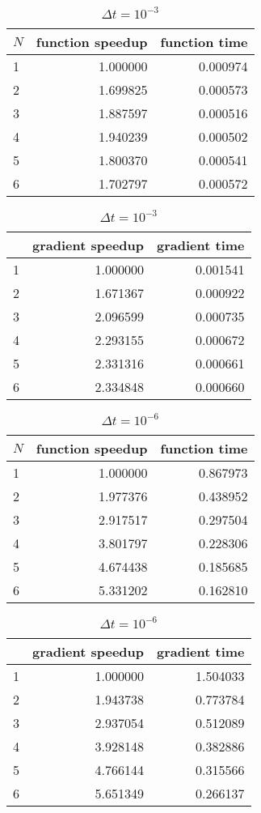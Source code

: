 \begin{table}[!h]
\centering
\caption{$\Delta t=10^{-3}$}
\begin{tabular}{lrr}
\toprule
{}$N$ &  function speedup &     function time \\
\midrule
1 &  1.000000 &  0.000974 \\
2 &  1.699825 &  0.000573 \\
3 &  1.887597 &  0.000516 \\
4 &  1.940239 &  0.000502 \\
5 &  1.800370 &  0.000541 \\
6 &  1.702797 &  0.000572 \\
\bottomrule
\end{tabular}
\begin{tabular}{lrr}
\toprule
{} &  gradient speedup &    gradient time \\
\midrule
1 &  1.000000 &  0.001541 \\
2 &  1.671367 &  0.000922 \\
3 &  2.096599 &  0.000735 \\
4 &  2.293155 &  0.000672 \\
5 &  2.331316 &  0.000661 \\
6 &  2.334848 &  0.000660 \\
\bottomrule
\end{tabular}
\end{table}
\begin{table}[!h]
\centering
\caption{$\Delta t=10^{-6}$}
\begin{tabular}{lrr}
\toprule
{} $N$&  function speedup &    function time \\
\midrule
1 &  1.000000 &  0.867973 \\
2 &  1.977376 &  0.438952 \\
3 &  2.917517 &  0.297504 \\
4 &  3.801797 &  0.228306 \\
5 &  4.674438 &  0.185685 \\
6 &  5.331202 &  0.162810 \\
\bottomrule
\end{tabular}
\begin{tabular}{lrr}
\toprule
{} &  gradient speedup &    gradient time \\
\midrule
1 &  1.000000 &  1.504033 \\
2 &  1.943738 &  0.773784 \\
3 &  2.937054 &  0.512089 \\
4 &  3.928148 &  0.382886 \\
5 &  4.766144 &  0.315566 \\
6 &  5.651349 &  0.266137 \\
\bottomrule
\end{tabular}
\end{table}
